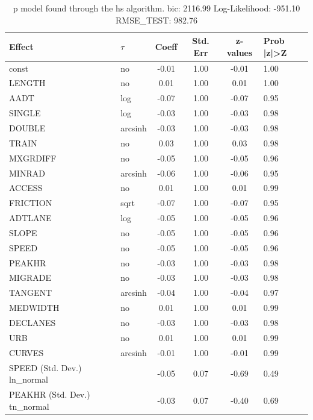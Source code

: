 \begin{table}
	\caption{p model found through the hs algorithm. bic: 2116.99 Log-Likelihood: -951.10 RMSE_TEST: 982.76}
	\begin{center}
		\begin{tabular}{|l|l|c|c|c|l|}
			\hline
			Effect & $\tau$ & Coeff & Std. Err & z-values & Prob |z|>Z \\
			\hline
			const & no & -0.01 & 1.00 & -0.01 & 1.00 \\
			\hline
			LENGTH & no & 0.01 & 1.00 & 0.01 & 1.00 \\
			\hline
			AADT & log & -0.07 & 1.00 & -0.07 & 0.95 \\
			\hline
			SINGLE & log & -0.03 & 1.00 & -0.03 & 0.98 \\
			\hline
			DOUBLE & arcsinh & -0.03 & 1.00 & -0.03 & 0.98 \\
			\hline
			TRAIN & no & 0.03 & 1.00 & 0.03 & 0.98 \\
			\hline
			MXGRDIFF & no & -0.05 & 1.00 & -0.05 & 0.96 \\
			\hline
			MINRAD & arcsinh & -0.06 & 1.00 & -0.06 & 0.95 \\
			\hline
			ACCESS & no & 0.01 & 1.00 & 0.01 & 0.99 \\
			\hline
			FRICTION & sqrt & -0.07 & 1.00 & -0.07 & 0.95 \\
			\hline
			ADTLANE & log & -0.05 & 1.00 & -0.05 & 0.96 \\
			\hline
			SLOPE & no & -0.05 & 1.00 & -0.05 & 0.96 \\
			\hline
			SPEED & no & -0.05 & 1.00 & -0.05 & 0.96 \\
			\hline
			PEAKHR & no & -0.03 & 1.00 & -0.03 & 0.98 \\
			\hline
			MIGRADE & no & -0.03 & 1.00 & -0.03 & 0.98 \\
			\hline
			TANGENT & arcsinh & -0.04 & 1.00 & -0.04 & 0.97 \\
			\hline
			MEDWIDTH & no & 0.01 & 1.00 & 0.01 & 0.99 \\
			\hline
			DECLANES & no & -0.03 & 1.00 & -0.03 & 0.98 \\
			\hline
			URB & no & 0.01 & 1.00 & 0.01 & 0.99 \\
			\hline
			CURVES & arcsinh & -0.01 & 1.00 & -0.01 & 0.99 \\
			\hline
			SPEED (Std. Dev.) ln_normal &  & -0.05 & 0.07 & -0.69 & 0.49 \\
			\hline
			PEAKHR (Std. Dev.) tn_normal &  & -0.03 & 0.07 & -0.40 & 0.69 \\

\end{tabular}
\end{center}
\end{table}
